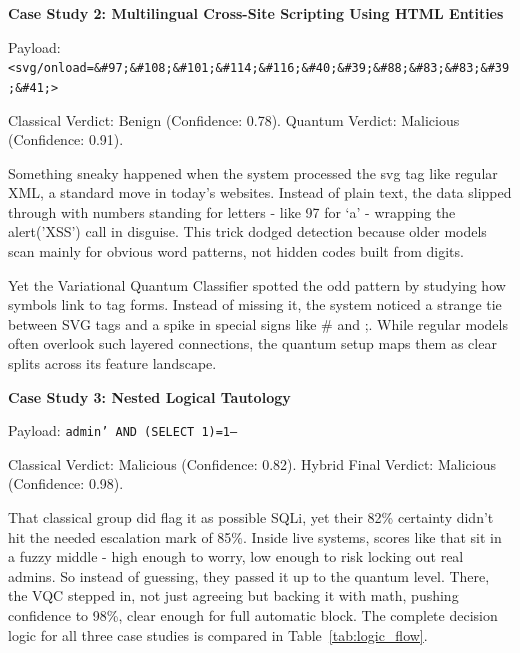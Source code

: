 \documentclass[journal,onecolumn]{IEEEtran}
\begin{document}
\textbf{Case Study 2: Multilingual Cross-Site Scripting Using HTML Entities}

Payload: \texttt{<svg/onload=\&\#97;\&\#108;\&\#101;\&\#114;\&\#116;\&\#40;\&\#39;\&\#88;\&\#83;\&\#83;\&\#39;\&\#41;>}

Classical Verdict: Benign (Confidence: 0.78). Quantum Verdict: Malicious (Confidence: 0.91).

Something sneaky happened when the system processed the svg tag like regular XML, a standard move in today's websites. Instead of plain text, the data slipped through with numbers standing for letters - like 97 for `a' - wrapping the alert('XSS') call in disguise. This trick dodged detection because older models scan mainly for obvious word patterns, not hidden codes built from digits.

Yet the Variational Quantum Classifier spotted the odd pattern by studying how symbols link to tag forms. Instead of missing it, the system noticed a strange tie between SVG tags and a spike in special signs like \# and ;. While regular models often overlook such layered connections, the quantum setup maps them as clear splits across its feature landscape.

\textbf{Case Study 3: Nested Logical Tautology}

Payload: \texttt{admin' AND (SELECT 1)=1--}

Classical Verdict: Malicious (Confidence: 0.82). Hybrid Final Verdict: Malicious (Confidence: 0.98).

That classical group did flag it as possible SQLi, yet their 82\% certainty didn't hit the needed escalation mark of 85\%. Inside live systems, scores like that sit in a fuzzy middle - high enough to worry, low enough to risk locking out real admins. So instead of guessing, they passed it up to the quantum level. There, the VQC stepped in, not just agreeing but backing it with math, pushing confidence to 98\%, clear enough for full automatic block. The complete decision logic for all three case studies is compared in Table~\ref{tab:logic_flow}.
\end{document}
